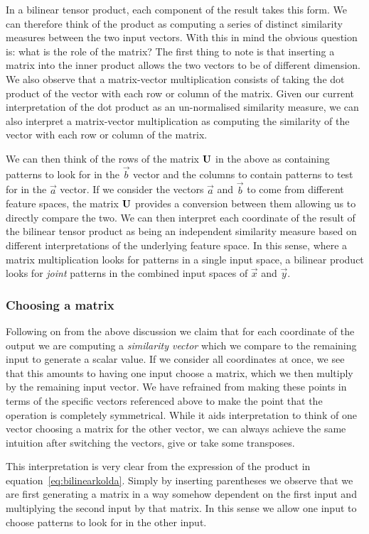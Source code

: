 In a bilinear tensor product, each component of the result takes this form.
We can therefore think of the
product as computing a series of distinct similarity measures between the two input
vectors. With this in mind the obvious question is: what is the role of the matrix? The first
thing to note is that inserting a matrix into the inner product allows the two vectors to be
of different dimension. We also observe that a matrix-vector multiplication consists of
taking the dot product of the vector with each row or column of the matrix. Given our current
interpretation of the dot product as an un-normalised similarity measure, we can also
interpret a matrix-vector multiplication as computing the similarity of the vector with each
row or column of the matrix. 

We can then think of the rows of the matrix \(\mathbf{U}\) in the
above as containing patterns to look for in the \(\vec{b}\) vector and the columns to
contain patterns to test for in the \(\vec{a}\) vector. If we consider the vectors 
\(\vec{a}\) and \(\vec{b}\) to come from different feature spaces, the matrix \(\mathbf{U}\)
provides a conversion between them allowing us to directly compare the two. We can then
interpret each coordinate of the result of the bilinear tensor product as being an
independent similarity measure based on different interpretations of the underlying
feature space. In this sense, where a matrix multiplication looks for patterns in a single input
space, a bilinear product looks for \emph{joint} patterns in the combined input spaces of
\(\vec{x}\) and \(\vec{y}\).


\subsubsection{Choosing a matrix}
Following on from the above discussion we claim that for each coordinate of the output we are
computing a \emph{similarity vector} which we compare to the remaining input to generate a
scalar value. If we consider all coordinates at once, we see that this amounts to having
one input choose a matrix, which we then multiply by the remaining input vector. We have
refrained from making these points in terms of the specific vectors referenced above to make
the point that the operation is completely symmetrical. While it aids interpretation to think
of one vector choosing a matrix for the other vector, we can always achieve the same
intuition after switching the vectors, give or take some transposes.

This interpretation is very clear from the expression of the product in
equation~\eqref{eq:bilinearkolda}. Simply by inserting parentheses we observe that we are
first generating a matrix in a way somehow dependent on the first input and multiplying
the second input by that matrix. In this sense we allow one input to choose patterns to look for
in the other input.

